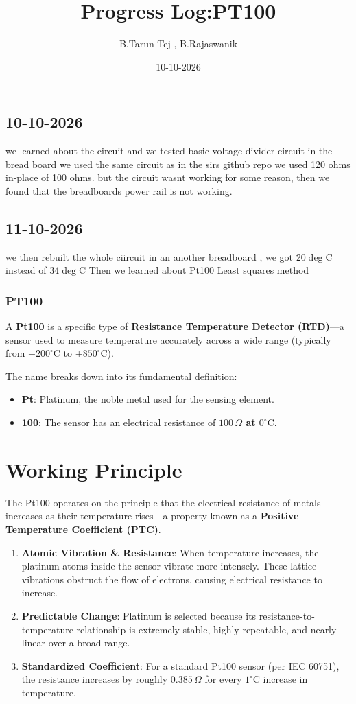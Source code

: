 \documentclass[12pt, a4paper]{article}
\title{Progress Log:PT100}
\author{B.Tarun Tej , B.Rajaswanik}
\date{10-10-2026}
\begin{document}
	\maketitle 
	\author{}
	
	\subsection{10-10-2026}
	we learned about the circuit and we tested basic voltage divider circuit in the bread board we used the same circuit as in the sirs github repo we used 120 ohms in-place of 100 ohms. but the circuit wasnt working for some reason, then we found that the breadboards power rail is not working.
	\subsection{11-10-2026}
	we then rebuilt the whole ciircuit in an another breadboard , we got 20$\deg$C instead of 34$\deg$C 
	Then we learned about Pt100 Least squares method
	\subsubsection{PT100}
	A \textbf{Pt100} is a specific type of \textbf{Resistance Temperature Detector (RTD)}—a sensor used to measure temperature accurately across a wide range (typically from $-200^\circ\text{C}$ to $+850^\circ\text{C}$).
	
	The name breaks down into its fundamental definition:
	\begin{itemize}
		\item \textbf{Pt}: Platinum, the noble metal used for the sensing element.
		\item \textbf{100}: The sensor has an electrical resistance of \textbf{$100\,\Omega$ at $0^\circ\text{C}$}.
	\end{itemize}
	
	\section*{Working Principle}
	
	The Pt100 operates on the principle that the electrical resistance of metals increases as their temperature rises—a property known as a \textbf{Positive Temperature Coefficient (PTC)}.
	
	\begin{enumerate}
		\item \textbf{Atomic Vibration \& Resistance}: When temperature increases, the platinum atoms inside the sensor vibrate more intensely. These lattice vibrations obstruct the flow of electrons, causing electrical resistance to increase.
		\item \textbf{Predictable Change}: Platinum is selected because its resistance-to-temperature relationship is extremely stable, highly repeatable, and nearly linear over a broad range.
		\item \textbf{Standardized Coefficient}: For a standard Pt100 sensor (per IEC 60751), the resistance increases by roughly $0.385\,\Omega$ for every $1^\circ\text{C}$ increase in temperature.
	\end{enumerate}
	
\end{document}
